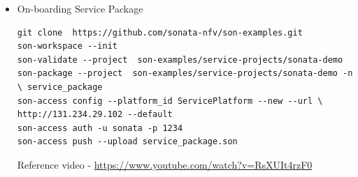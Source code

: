 \begin{itemize}
\begin{itemize}
\begin{figure}[h]
				\label{fig:linkingstep11}
			\end{figure}
			\newpage	
			\item On-boarding Service Package
			\begin{lstlisting}
git clone  https://github.com/sonata-nfv/son-examples.git
son-workspace --init
son-validate --project  son-examples/service-projects/sonata-demo
son-package --project  son-examples/service-projects/sonata-demo -n \ service_package
son-access config --platform_id ServicePlatform --new --url \ http://131.234.29.102 --default 
son-access auth -u sonata -p 1234
son-access push --upload service_package.son
			\end{lstlisting}
			Reference video - \hyperlink{name}{https://www.youtube.com/watch?v=RsXUIt4rzF0}
		\end{itemize}
		
	\end{itemize}
	
	
